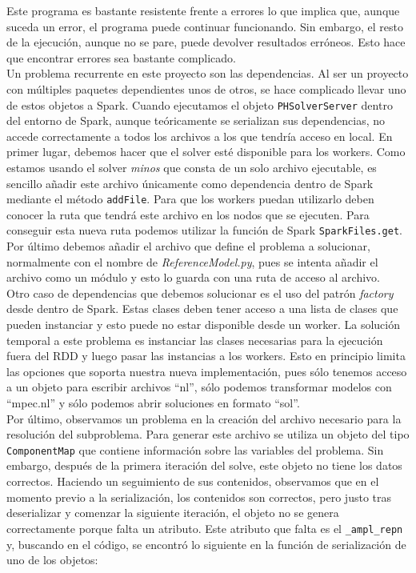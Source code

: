 Este programa es bastante resistente frente a errores lo que implica que, aunque suceda un error, el programa puede continuar funcionando. Sin embargo, el resto de la ejecución, aunque no se pare, puede devolver resultados erróneos. Esto hace que encontrar errores sea bastante complicado.\\

Un problema recurrente en este proyecto son las dependencias. Al ser un proyecto con múltiples paquetes dependientes unos de otros, se hace complicado llevar uno de estos objetos a Spark. Cuando ejecutamos el objeto \texttt{PHSolverServer} dentro del entorno de Spark, aunque teóricamente se serializan sus dependencias, no accede correctamente a todos los archivos a los que tendría acceso en local.
En primer lugar, debemos hacer que el solver esté disponible para los workers. Como estamos usando el solver \textit{minos} que consta de un solo archivo ejecutable, es sencillo añadir este archivo únicamente como dependencia dentro de Spark mediante el método \texttt{addFile}. Para que los workers puedan utilizarlo deben conocer la ruta que tendrá este archivo en los nodos que se ejecuten. Para conseguir esta nueva ruta podemos utilizar la función de Spark \texttt{SparkFiles.get}. Por último debemos añadir el archivo que define el problema a solucionar, normalmente con el nombre de \textit{ReferenceModel.py}, pues se intenta añadir el archivo como un módulo y esto lo guarda con una ruta de acceso al archivo.\\

Otro caso de dependencias que debemos solucionar es el uso del patrón \textit{factory} desde dentro de Spark. Estas clases deben tener acceso a una lista de clases que pueden instanciar y esto puede no estar disponible desde un worker. La solución temporal a este problema es instanciar las clases necesarias para la ejecución fuera del RDD y luego pasar las instancias a los workers. Esto en principio limita las opciones que soporta nuestra nueva implementación, pues sólo tenemos acceso a un objeto para escribir archivos ``nl'', sólo podemos transformar modelos con ``mpec.nl'' y sólo podemos abrir soluciones en formato ``sol''. \\

Por último, observamos un problema en la creación del archivo necesario para la resolución del subproblema. Para generar este archivo se utiliza un objeto del tipo \texttt{ComponentMap} que contiene información sobre las variables del problema. Sin embargo, después de la primera iteración del solve, este objeto no tiene los datos correctos. Haciendo un seguimiento de sus contenidos, observamos que en el momento previo a la serialización, los contenidos son correctos, pero justo tras deserializar y comenzar la siguiente iteración, el objeto no se genera correctamente porque falta un atributo. Este atributo que falta es el \texttt{\_ampl\_repn} y, buscando en el código, se encontró lo siguiente en la función de serialización de uno de los objetos:

